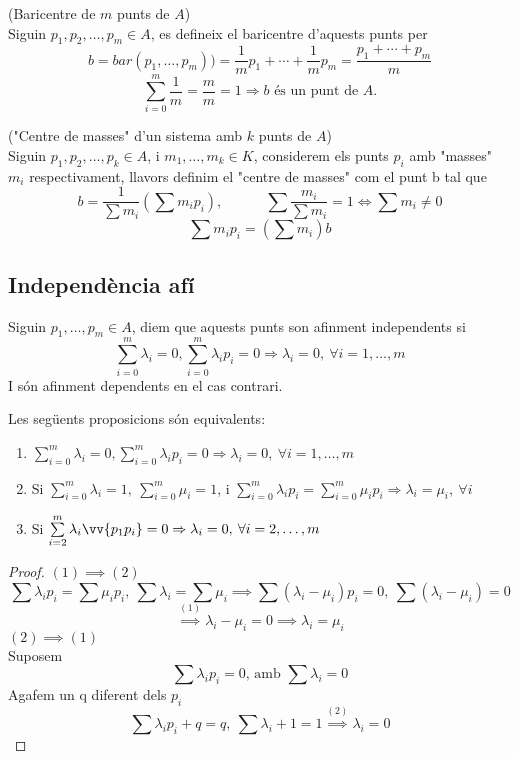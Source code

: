 \begin{exmp}(Baricentre de $m$ punts de $A$)\\
	Siguin $p_1,p_2,\dotsc ,p_m\in A$, es defineix el baricentre d'aquests punts per
	$$b=bar(p_1,\dotsc ,p_m))=\frac{1}{m}p_1+\dotsb +\frac{1}{m}p_m=\frac{p_1+\dotsb +p_m}{m}$$
	$$\sum\limits_{i=0}^m\frac{1}{m}=\frac{m}{m}=1\Rightarrow b\text{ és un punt de }A.$$
\end{exmp}
\begin{exmp}("Centre de masses" d'un sistema amb $k$ punts de $A$)\\
	Siguin $p_1,p_2,\dotsc ,p_k\in A$, i $m_1,\dotsc ,m_k\in K$, considerem els punts $p_i$ amb "masses" $m_i$ respectivament, llavors definim el "centre de masses" com el punt b tal que
	$$b=\frac{1}{\sum m_i}(\sum m_ip_i),\hspace{3em}\sum\frac{m_i}{\sum m_i}=1 \Leftrightarrow \sum m_i \neq 0$$
	$$\sum m_ip_i=(\sum m_i)b$$ 
\end{exmp}

\subsection{Independència afí}
\label{ss_indafi}

\begin{defn}
	Siguin $p_1,\dotsc ,p_m\in A$, diem que aquests punts son afinment independents si
	$$\sum\limits_{i=0}^m\lambda_i=0, \sum\limits_{i=0}^m\lambda_ip_i=0\Rightarrow\lambda_i=0,\:\forall i=1,\dotsc ,m$$
	I són afinment dependents en el cas contrari.
\end{defn}

\begin{lem}
	Les següents proposicions són equivalents:
	\begin{enumerate}
		\item $\sum\limits_{i=0}^m\lambda_i=0, \sum\limits_{i=0}^m\lambda_ip_i=0\Rightarrow\lambda_i=0,\:\forall i=1,\dotsc ,m$
		\item Si $\sum\limits_{i=0}^m\lambda_i=1,\:\sum\limits_{i=0}^m\mu_i=1$, i $\sum\limits_{i=0}^m\lambda_ip_i=\sum\limits_{i=0}^m\mu_ip_i\Rightarrow \lambda_i=\mu_i,\:\forall i$
		\item Si $\sum\limits_{i=2}^m\lambda_i\vv{p_1p_i}=0\Rightarrow \lambda_i=0,\:\forall i=2,\dotsc ,m$
	\end{enumerate}
\end{lem}
\begin{proof}
	$(1)\implies (2)$ \\
	$$\sum\lambda_ip_i=\sum\mu_ip_i,\:\sum\lambda_i=\sum\mu_i\implies \sum(\lambda_i-\mu_i)p_i=0,\:\sum(\lambda_i-\mu_i)=0$$
	$$\overset{(1)}{\implies}\lambda_i-\mu_i=0\implies\lambda_i=\mu_i$$
	$(2)\implies (1)$ \\
	Suposem
	$$\sum\lambda_ip_i=0\text{, amb }\sum\lambda_i=0$$
	Agafem un q diferent dels $p_i$
	$$\sum\lambda_ip_i+q=q,\:\sum\lambda_i+1=1\overset{(2)}{\implies}\lambda_i=0$$
\end{proof}

